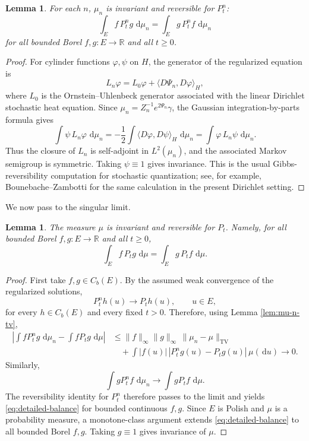 \documentclass[12pt]{article}
\numberwithin{equation}{section}
\newtheorem{lemma}[theorem]{Lemma}
\newcommand{\dd}{\,\mathrm d}
\newcommand{\1}{\mathbf 1}
\newcommand{\R}{\mathbb R}
\begin{document}
\begin{lemma}\label{lem:approx-reversible}
For each $n$, $\mu_n$ is invariant and reversible for $P_t^n$:
\[
        \int_E f\,P_t^n g\,\dd\mu_n
        =
        \int_E g\,P_t^n f\,\dd\mu_n
\]
for all bounded Borel $f,g:E\to\R$ and all $t\geq0$.
\end{lemma}

\begin{proof}
For cylinder functions $\varphi,\psi$ on $H$, the generator of the regularized
equation is
\[
        L_n\varphi=L_0\varphi+\langle D\Psi_n,D\varphi\rangle_H,
\]
where $L_0$ is the Ornstein--Uhlenbeck generator associated with the linear
Dirichlet stochastic heat equation. Since $\mu_n=Z_n^{-1}e^{2\Psi_n}\gamma$, the
Gaussian integration-by-parts formula gives
\[
        \int \psi\,L_n\varphi\,\dd\mu_n
        =
        -\frac12\int \langle D\varphi,D\psi\rangle_H\,\dd\mu_n
        =
        \int \varphi\,L_n\psi\,\dd\mu_n .
\]
Thus the closure of $L_n$ is self-adjoint in $L^2(\mu_n)$, and the associated
Markov semigroup is symmetric. Taking $\psi\equiv1$ gives invariance. This is the
usual Gibbs-reversibility computation for stochastic quantization; see, for example,
Bounebache--Zambotti \cite[Section 4]{BZ14} for the same calculation in the present
Dirichlet setting.
\end{proof}

We now pass to the singular limit.

\begin{lemma}\label{lem:limit-reversible}
The measure $\mu$ is invariant and reversible for $P_t$. Namely, for all bounded
Borel $f,g:E\to\R$ and all $t\geq0$,
\begin{equation}\label{eq:detailed-balance}
        \int_E f\,P_tg\,\dd\mu
        =
        \int_E g\,P_tf\,\dd\mu .
\end{equation}
\end{lemma}

\begin{proof}
First take $f,g\in C_b(E)$. By the assumed weak convergence of the regularized
solutions,
\[
        P_t^n h(u)\longrightarrow P_t h(u),\qquad u\in E,
\]
for every $h\in C_b(E)$ and every fixed $t>0$. Therefore, using Lemma
\ref{lem:mu-n-tv},
\[
\begin{aligned}
\left|\int fP_t^ng\,\dd\mu_n-\int fP_tg\,\dd\mu\right|
&\leq
\|f\|_\infty\|g\|_\infty\,\|\mu_n-\mu\|_{\mathrm{TV}}        \\
&\quad
+\int |f(u)|\,|P_t^ng(u)-P_tg(u)|\,\mu(\dd u)
\longrightarrow0.
\end{aligned}
\]
Similarly,
\[
        \int gP_t^nf\,\dd\mu_n\longrightarrow \int gP_tf\,\dd\mu .
\]
The reversibility identity for $P_t^n$ therefore passes to the limit and yields
\eqref{eq:detailed-balance} for bounded continuous $f,g$. Since $E$ is Polish and
$\mu$ is a probability measure, a monotone-class argument extends
\eqref{eq:detailed-balance} to all bounded Borel $f,g$. Taking $g\equiv1$ gives
invariance of $\mu$.
\end{proof}
\end{document}
